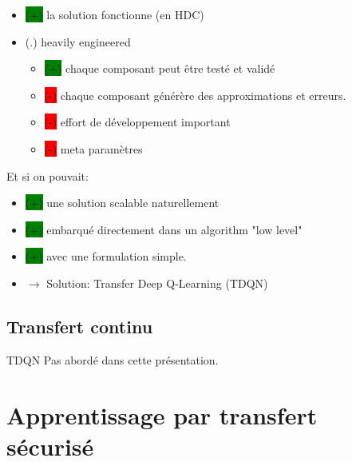 \documentclass[french,handout]{beamer}
\newcommand{\cplus}{\colorbox{green}{(+)} }
\newcommand{\cmoins}{\colorbox{red}{(-)} }
\begin{document}
    \begin{frame}
        \begin{itemize}
            \item \cplus la solution fonctionne (en HDC)
            \item (.) heavily engineered
            \begin{itemize}
                \item \cplus chaque composant peut être testé et validé
                \item \cmoins chaque composant générère des approximations et erreurs.
                \item \cmoins effort de développement important
                \item \cmoins meta paramètres
            \end{itemize}
        \end{itemize}

        Et si on pouvait:
        \begin{itemize}
            \item \cplus une solution scalable naturellement
            \item \cplus embarqué directement dans un algorithm "low level"
            \item \cplus avec une formulation simple.
            \item $\rightarrow$ Solution: Transfer Deep Q-Learning (TDQN)
        \end{itemize}

    \end{frame}


    \subsection{Transfert continu}
    \begin{frame}{TDQN}
        Pas abordé dans cette présentation.
    \end{frame}

    \section{Apprentissage par transfert sécurisé}
\end{document}
